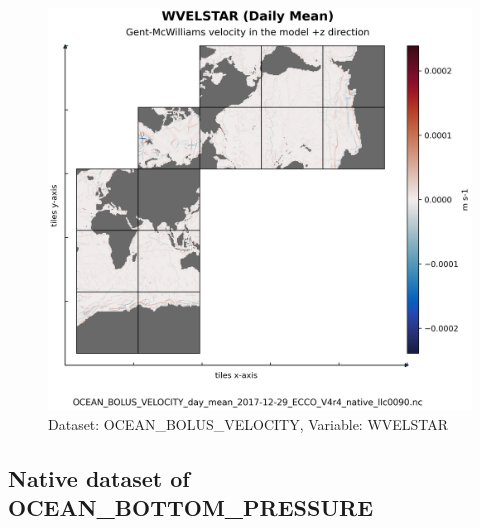 \begin{figure}[H]
\centering
\includegraphics[scale=0.55]{../images/plots/native_plots/Gent-McWilliams_Ocean_Bolus_Velocity/WVELSTAR.png}
\caption{Dataset: OCEAN\_BOLUS\_VELOCITY, Variable: WVELSTAR}
\label{tab:table-OCEAN_BOLUS_VELOCITY_WVELSTAR-Plot}
\end{figure}
\subsection{Native dataset of OCEAN\_BOTTOM\_PRESSURE}
\newp
